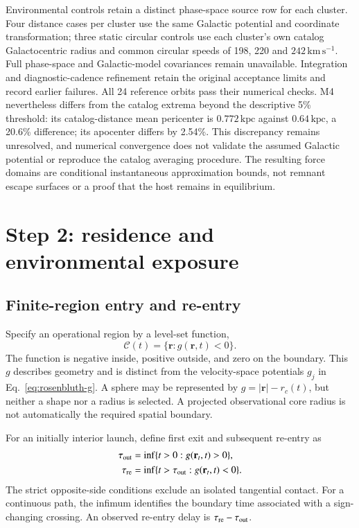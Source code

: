\documentclass[aps,prd,reprint,amsmath,amssymb,superscriptaddress,nofootinbib,longbibliography,floatfix]{revtex4-2}
\begin{document}
Environmental controls retain a distinct phase-space source row for each cluster. Four distance cases per cluster use the same Galactic potential and coordinate transformation; three static circular controls use each cluster's own catalog Galactocentric radius and common circular speeds of 198, 220 and $242\,\mathrm{km\,s^{-1}}$. Full phase-space and Galactic-model covariances remain unavailable. Integration and diagnostic-cadence refinement retain the original acceptance limits and record earlier failures. All 24 reference orbits pass their numerical checks. M4 nevertheless differs from the catalog extrema beyond the descriptive 5\% threshold: its catalog-distance mean pericenter is $0.772\,\mathrm{kpc}$ against $0.64\,\mathrm{kpc}$, a 20.6\% difference; its apocenter differs by 2.54\%. This discrepancy remains unresolved, and numerical convergence does not validate the assumed Galactic potential or reproduce the catalog averaging procedure. The resulting force domains are conditional instantaneous approximation bounds, not remnant escape surfaces or a proof that the host remains in equilibrium.


\section{Step 2: residence and environmental exposure}\label{sec:exposure}

\subsection{Finite-region entry and re-entry}

Specify an operational region by a level-set function,
\begin{equation}
\mathcal C(t)=\{\mathbf r:g(\mathbf r,t)<0\}.
\label{eq:region}
\end{equation}
The function is negative inside, positive outside, and zero on the boundary. This $g$ describes geometry and is distinct from the velocity-space potentials $g_j$ in Eq.~\eqref{eq:rosenbluth-g}. A sphere may be represented by $g=|\mathbf r|-r_c(t)$, but neither a shape nor a radius is selected. A projected observational core radius is not automatically the required spatial boundary.

For an initially interior launch, define first exit and subsequent re-entry as
\begin{align}
\tau_{\rm out}&=\inf\{t>0:g(\mathbf r_t,t)>0\},
\label{eq:exit}\\
\tau_{\rm re}&=\inf\{t>\tau_{\rm out}:g(\mathbf r_t,t)<0\}.
\label{eq:reentry}
\end{align}
The strict opposite-side conditions exclude an isolated tangential contact. For a continuous path, the infimum identifies the boundary time associated with a sign-changing crossing. An observed re-entry delay is $\tau_{\rm re}-\tau_{\rm out}$.
\end{document}
